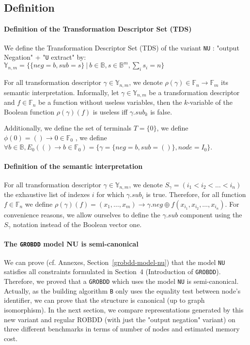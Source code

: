 \documentclass[a4paper,10pt]{article}
\newcommand{\B}{\mathbb{B}}
\newcommand{\F}{\mathbb{F}}
\newcommand{\Y}{\mathbb{Y}}
\newcommand{\uextract}{"\texttt{U} extract"}
\newcommand{\GroBdd}{\texttt{GROBDD}}
\begin{document}
\subsection{Definition}

\paragraph{Definition of the Transformation Descriptor Set (TDS)}

We define the Transformation Descriptor Set (TDS) of the variant \texttt{NU} : "output Negation" + \uextract{} by: $\Y_{n, m} = \{\{neg = b, sub = s\}~|~ b\in\B, s\in\B^m, \sum_i s_i = n\}$

For all transformation descriptor $\gamma\in\Y_{n, m}$, we denote $\rho(\gamma) \in \F_n \rightarrow \F_m$ its semantic interpretation.
Informally, let $\gamma\in\Y_{n, m}$ be a transformation descriptor and $f\in\F_n$ be a function without useless variables, then the $k$-variable of the Boolean function $\rho(\gamma)(f)$ is useless iff $\gamma.sub_k$ is false.

Additionally, we define the set of terminals $T=\{0\}$, we define $\phi(0)=()\longrightarrow{}0\in\F_0$ , we define $\forall b\in\B, E_0(()\longrightarrow b\in\F_0) = \{\gamma = \{neg = b, sub = ()\}, node = I_0\}$.

\paragraph{Definition of the semantic interpretation}

For all transformation descriptor $\gamma\in\Y_{n, m}$, we denote $S_\gamma = \left(i_1 < i_2 < \dots < i_n\right)$ the exhaustive list of indexes $i$ for which $\gamma.sub_i$ is true.
Therefore, for all function $f\in\F_n$ we define $\rho(\gamma)(f) = (x_1, \dots, x_m) \longrightarrow \gamma.neg \oplus f(x_{i_1}, x_{i_2}, \dots, x_{i_n})$.
For convenience reasons, we allow ourselves to define the $\gamma.sub$ component using the $S_\gamma$ notation instead of the Boolean vector one.


 
\paragraph{The \GroBdd{} model NU is semi-canonical}
We can prove (cf. Annexes, Section~\ref{grobdd-model-nu}) that the model \texttt{NU} satisfies all constraints formulated in Section~4 (Introduction of \GroBdd{}).
Therefore, we proved that a \GroBdd{} which uses the model \texttt{NU} is semi-canonical.
Actually, as the building algorithm \texttt{B} only uses the equality test between node's identifier, we can prove that the structure is canonical (up to graph isomorphism).
In the next section, we compare representations generated by this new variant and regular ROBDD (with just the "output negation" variant) on three different benchmarks in terms of number of nodes and estimated memory cost.
\end{document}
